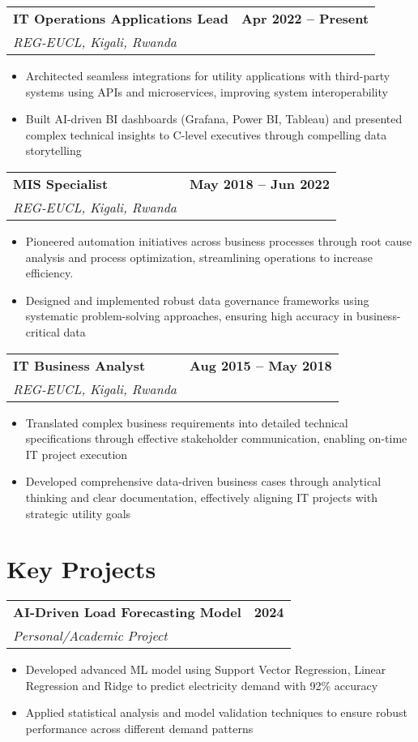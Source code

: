 \documentclass[11pt,letterpaper]{article}
\makeatletter
\newenvironment{cventry}[4]{
	\noindent\begin{tabularx}{\linewidth}{@{}X@{\hspace{15pt}}r@{}}
		\textbf{\color{primarycolor}#1} & \textbf{\color{secondarycolor}#4} \\
		\textit{\color{secondarycolor}#2, #3} & \\
	\end{tabularx}
	\vspace{4pt}
	\begin{itemize}[nosep,leftmargin=18pt,itemsep=3pt,topsep=0pt]
	}{
	\end{itemize}
	\vspace{8pt}
}
\newenvironment{cvproject}[3]{
	\noindent\begin{tabularx}{\linewidth}{@{}X@{\hspace{15pt}}r@{}}
		\textbf{\color{primarycolor}#1} & \textbf{\color{secondarycolor}#3} \\
		\textit{\color{secondarycolor}#2} & \\
	\end{tabularx}
	\vspace{4pt}
	\begin{itemize}[nosep,leftmargin=18pt,itemsep=3pt,topsep=0pt]
	}{
	\end{itemize}
	\vspace{8pt}
}
\makeatother
\begin{document}
	\begin{cventry}{IT Operations Applications Lead}{REG-EUCL}{Kigali, Rwanda}{Apr 2022 -- Present}
		\item Architected seamless integrations for utility applications with third-party systems using APIs and microservices, improving system interoperability
		\item Built AI-driven BI dashboards (Grafana, Power BI, Tableau) and presented complex technical insights to C-level executives through compelling data storytelling
	\end{cventry}
	
	\begin{cventry}{MIS Specialist}{REG-EUCL}{Kigali, Rwanda}{May 2018 -- Jun 2022}
		\item Pioneered automation initiatives across business processes through root cause analysis and process optimization, streamlining operations to increase efficiency.
		\item Designed and implemented robust data governance frameworks using systematic problem-solving approaches, ensuring high accuracy in business-critical data
	\end{cventry}
	
	\begin{cventry}{IT Business Analyst}{REG-EUCL}{Kigali, Rwanda}{Aug 2015 -- May 2018}
		\item Translated complex business requirements into detailed technical specifications through effective stakeholder communication, enabling on-time IT project execution
		\item Developed comprehensive data-driven business cases through analytical thinking and clear documentation, effectively aligning IT projects with strategic utility goals
	\end{cventry}
	
	\section*{Key Projects}
	
	\begin{cvproject}{AI-Driven Load Forecasting Model}{Personal/Academic Project}{2024}
		\item Developed advanced ML model using Support Vector Regression, Linear Regression and Ridge to predict electricity demand with 92\% accuracy
		\item Applied statistical analysis and model validation techniques to ensure robust performance across different demand patterns
	\end{cvproject}
	
\end{document}
